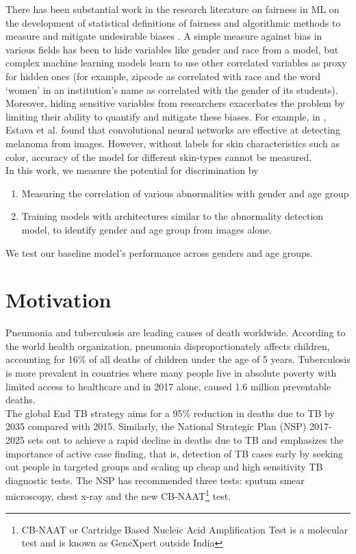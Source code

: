 \documentclass[12pt,twoside,a4paper]{report}
\begin{document}
There has been substantial work in the research literature on fairness in ML on
the development of statistical definitions of fairness
\cite{chouldechova2017fair,dwork2012fairness,hardt2016equality} and algorithmic
methods to measure and mitigate undesirable biases
\cite{agarwal2018reductions,hardt2016equality,kusner2017counterfactual}. A
simple measure against bias in various fields has been to hide variables like
gender and race from a model, but complex machine learning models learn to use
other correlated variables as proxy for hidden ones (for example, zipcode as
correlated with race and the word `women' in an institution's name as correlated
with the gender of its students\cite{dastin_2018}). Moreover, hiding sensitive
variables from researchers exacerbates the problem by limiting their ability to
quantify and mitigate these biases. For example, in
\cite{esteva2017dermatologist}, Estava et al. found that convolutional neural
networks are effective at detecting melanoma from images. However, without
labels for skin characteristics such as color, accuracy of the
model for different skin-types cannot be measured.\\

In this work, we measure the potential for discrimination by
\begin{enumerate}
\item{Measuring the correlation of various abnormalities with gender and age
    group}
\item{Training models with architectures similar to the abnormality detection
    model, to identify gender and age group from images alone.}
\end{enumerate}
We test our baseline model's performance across genders and age groups.
\section{Motivation\label{motivation}}
Pneumonia and tuberculosis are leading causes of death worldwide. According to
the world health organization, pneumonia disproportionately affects children,
accounting for 16\% of all deaths of children under the age of 5 years\cite{}.
Tuberculosis is more prevalent in countries where many people live in absolute
poverty\cite{} with limited access to healthcare and in 2017 alone, caused 1.6
million preventable deaths\cite{}.\\

The global End TB strategy aims for a 95\% reduction in deaths due to TB by 2035
compared with 2015. Similarly, the National Strategic Plan (NSP) 2017-2025 sets
out to achieve a rapid decline in deaths due to TB and emphasizes the importance
of active case finding, that is, detection of TB cases early by seeking out
people in targeted groups and scaling up cheap and high sensitivity TB
diagnostic tests. The NSP has recommended three tests: sputum smear microscopy,
chest x-ray and the new CB-NAAT\footnote{CB-NAAT or Cartridge Based Nucleic Acid
  Amplification Test is a molecular test and is
  known as GeneXpert outside India} test.\\
\end{document}

